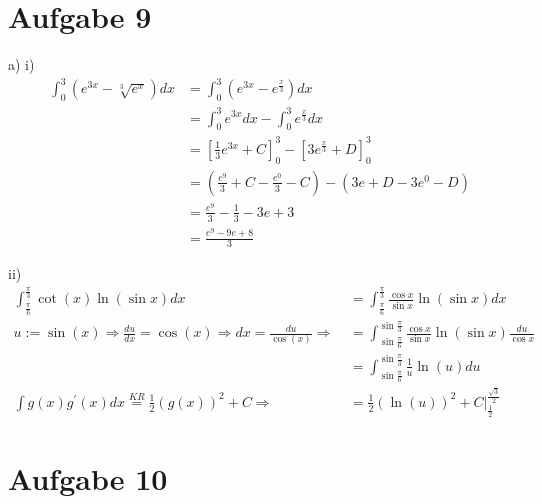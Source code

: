\documentclass[a4paper]{article}
\begin{document}
\thispagestyle{fancy}
\section*{Aufgabe 9}
\par{a) i)}
\begin{align*}
	\int_0^3 \left(e^{3x} - \sqrt[3]{e^x} \right) dx
	&= \int_0^3 \left(e^{3x} - e^{\frac x3} \right) dx \\
	&= \int_0^3 e^{3x} dx - \int_0^3 e^{\frac x3} dx \\
	&= \left[ \frac13 e^{3x} + C \right]_0^3 -
	\left[3 e^{\frac x 3} + D \right]_0^3 \\
	&= \left( \frac{e^9}{3} + C - \frac{e^0}{3} - C \right) -
	\left(3e + D - 3e^0 - D \right) \\
	&= \frac{e^9}{3} - \frac13 - 3e + 3 \\
	&= \frac{e^9 - 9e +8}{3}
\end{align*}
\par{ii)}
\begin{align*}
	\int_{\frac\pi6}^{\frac\pi3} \cot(x) \ln(\sin x) dx
	&= \int_{\frac\pi6}^{\frac\pi3} 
	\frac{\cos x}{\sin x} \ln(\sin x) dx \\
	u := \sin(x) \Rightarrow \frac{du}{dx} = \cos(x) 
	\Rightarrow dx = \frac{du}{\cos(x)}
	\Rightarrow \
	&= \int_{\sin\frac\pi6}^{\sin\frac\pi3} 
	\frac{\cos x}{\sin x} \ln(\sin x) \frac{du}{\cos x} \\
	&= \int_{\sin\frac\pi6}^{\sin\frac\pi3}
	\frac1{u} \ln(u) du \\
	\int g(x) g^\prime(x) dx \overset{KR}{=} 
	\frac12\left(g(x)\right)^2 + C
	\Rightarrow \
	&= \frac12 \left(\ln(u)\right)^2 + C 
	\vert_{\frac12}^{\frac{\sqrt{3}}{2}}
\end{align*}



\section*{Aufgabe 10}
\end{document}

